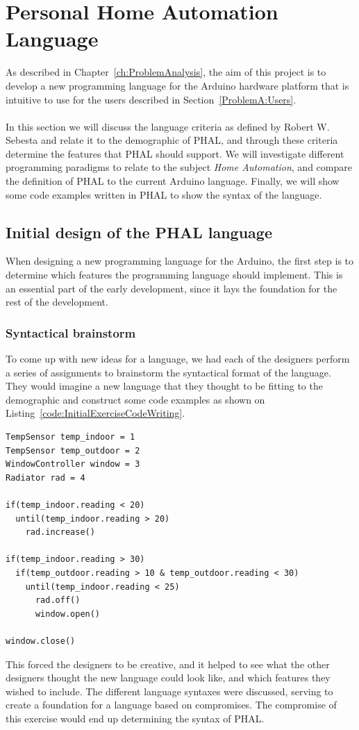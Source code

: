 \chapter{Personal Home Automation Language}\label{sec:PersonalHomeAutomationLanguage}
As described in Chapter~\ref{ch:ProblemAnalysis}, the aim of this project is to develop a new programming language for the Arduino hardware platform that is intuitive to use for the users described in Section~\ref{ProblemA:Users}.
\\\\
In this section we will discuss the language criteria as defined by Robert W. Sebesta and relate it to the demographic of PHAL, and through these criteria determine the features that PHAL should support. We will investigate different programming paradigms to relate to the subject \textit{Home Automation}, and compare the definition of PHAL to the current Arduino language. Finally, we will show some code examples written in PHAL to show the syntax of the language.

\section{Initial design of the PHAL language}
When designing a new programming language for the Arduino, the first step is to determine which features the programming language should implement. This is an essential part of the early development, since it lays the foundation for the rest of the development.  

\subsection{Syntactical brainstorm}
To come up with new ideas for a language, we had each of the designers perform a series of assignments to brainstorm the syntactical format of the language. They would imagine a new language that they thought to be fitting to the demographic and construct some code examples as shown on Listing~\ref{code:InitialExerciseCodeWriting}. 
\begin{lstlisting}[caption={This listing shows how a designer imagined the new language to look like}, label={code:InitialExerciseCodeWriting}]
TempSensor temp_indoor = 1
TempSensor temp_outdoor = 2
WindowController window = 3
Radiator rad = 4

if(temp_indoor.reading < 20)
  until(temp_indoor.reading > 20)
    rad.increase()

if(temp_indoor.reading > 30)
  if(temp_outdoor.reading > 10 & temp_outdoor.reading < 30)
    until(temp_indoor.reading < 25)
      rad.off()
      window.open()

window.close()
\end{lstlisting}
This forced the designers to be creative, and it helped to see what the other designers thought the new language could look like, and which features they wished to include. The different language syntaxes were discussed, serving to create a foundation for a language based on compromises. The compromise of this exercise would end up determining the syntax of PHAL. 

